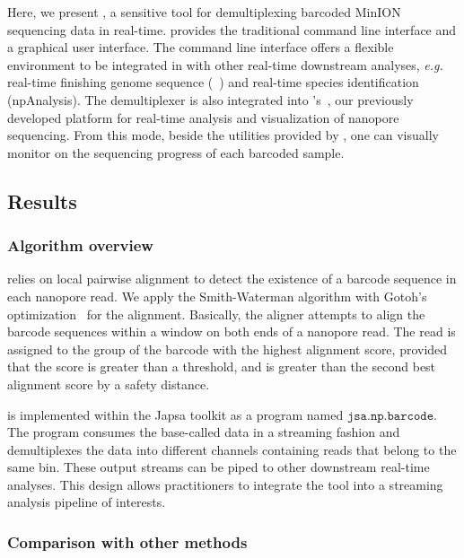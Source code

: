 Here, we present \npbarcode{}, a sensitive tool for demultiplexing barcoded MinION sequencing data in real-time. \npbarcode{} provides the traditional command line interface and a graphical user interface.
The command line interface offers a flexible environment to be integrated in with other real-time downstream analyses, \emph{e.g.} real-time finishing genome sequence (\npscarf{}~\cite{Cao2017scaffolding}) and real-time 
species identification (npAnalysis\cite{CaoGE2016}). The demultiplexer is also integrated into \npreader{}'s~\cite{CaoGC2016}, our previously developed platform for real-time analysis and visualization of nanopore sequencing.
From this mode, beside the utilities provided by \npreader{}, one can visually monitor on the sequencing progress of each barcoded sample.

\subsection{Results}
\subsubsection{Algorithm overview}
\npbarcode{} relies on local pairwise alignment to detect the existence of a barcode sequence in each nanopore read. We apply the Smith-Waterman algorithm with Gotoh's optimization~\cite{Gotoh1982improved} for the alignment. Basically, 
the aligner attempts to align the barcode sequences within a window on both ends of a nanopore read. The read is assigned to the group of the barcode with the highest alignment score, provided that the score is greater than a threshold, and is greater than the second best alignment score by a safety distance.

\npbarcode{} is implemented within the Japsa toolkit as a program named $\mathtt{jsa.np.barcode}$.
The program consumes the base-called data in a streaming fashion and demultiplexes the data into different channels containing reads that belong to the same bin. 
These output streams can be piped to other downstream real-time analyses.
This design allows practitioners to integrate the tool into a streaming analysis pipeline of interests.

\subsubsection{Comparison with other methods}

